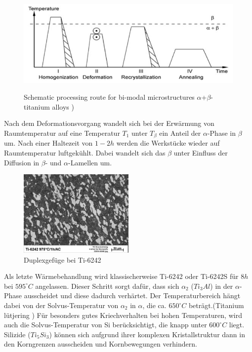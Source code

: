 \begin{figure}[H]
	
	\centering
	
	{\includegraphics[width=1\textwidth]{Bilder/WB}}			
	\caption{Schematic processing route for bi-modal microstructures $\alpha$+$\beta$-titanium alloys )}
	\label{fig:WB}
\end{figure}

Nach dem Deformationsvorgang wandelt sich bei der Erwärmung von Raumtemperatur  auf eine Temperatur $T_1$ unter $T_{\beta}$  ein Anteil der $\alpha$-Phase in $\beta$ um. Nach einer Haltezeit von $1-2h$ werden die Werkstücke wieder auf Raumtemperatur luftgekühlt.
Dabei wandelt sich das $\beta$ unter Einfluss der Diffusion in $\beta$- und $\alpha$-Lamellen um.

\begin{figure}[H]
	\centering
	\includegraphics[width=0.5\textwidth]{Bilder/LM-975-1h-AC}
	\caption{Duplexgefüge bei Ti-6242}
	\label{fig:L.M}
\end{figure}


Als letzte Wärmebehandlung wird klassischerweise  Ti-6242 oder Ti-6242S für  $8 h$ bei $595^\circ C$ angelassen. Dieser Schritt sorgt dafür, dass sich $\alpha_2$ ($Ti_3Al$) in der $\alpha$-Phase ausscheidet und diese dadurch verhärtet. Der Temperaturbereich hängt dabei von der Solvus-Temperatur von $\alpha_2$ in $\alpha$, die ca. $650^\circ C$ beträgt.(Titanium lütjering )
Für besonders gutes Kriechverhalten bei hohen Temperaturen, wird auch die Solvus-Temperatur von Si berücksichtigt, die knapp unter $600^\circ C$ liegt. Silizide ($Ti_5Si_3$) können sich aufgrund ihrer komplexen Kristallstruktur dann in den Korngrenzen ausscheiden und Kornbewegungen verhindern.


